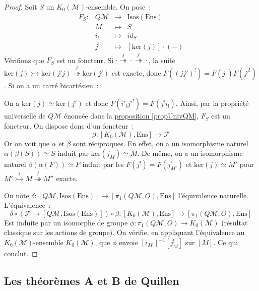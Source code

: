 \documentclass{amsart}
\newcommand{\sref}[2]{\hyperref[#2]{#1 \ref*{#2}}}
\theoremstyle{plain}
\theoremstyle{definition}
\theoremstyle{remark}
\newcommand{\M}{\mathcal{M}}
\newcommand{\Isos}[1]{\mathrm{Isos}(#1)}
\newcommand{\Ens}{\mathrm{Ens}}
\newcommand{\xrightarrowtail}[1]{\overset{#1}{\rightarrowtail}}
\newcommand{\xtwoheadrightarrow}[1]{\overset{#1}{\twoheadrightarrow}}
\newcommand{\ra}{\rightarrow}
\newcommand{\exacname}[5]{{#1}\xrightarrowtail{#2} {#3}\xtwoheadrightarrow{#4} {#5}}
\newcommand{\myker}[1]{\mathrm{ker}({#1})}
\begin{document}
\begin{proof}
  Soit $S$ un $K_0(\M)$-ensemble. On pose~:
  \[
    \begin{array}{cccc}
      F_S: & Q\M                                       &\ra    & \Isos{\Ens} \\
           & M                                         &\mapsto& S   \\
           & i_!                                       &\mapsto& id_S \\
           & j^!                                       &\mapsto& [\myker{j}]\cdot(-)
    \end{array}
  \]
  Vérifions que $F_S$ est un foncteur. Si $\cdot\xtwoheadrightarrow{j}\cdot\xtwoheadrightarrow{j'}\cdot$, la suite
  $\exacname{\myker{j}}{}{\myker{j'j}}{j}{\myker{j'}}$
  est exacte, donc $F((jj')^!)=F(j^!)F(j'^!)$. Si on a un carré bicartésien~:
  \begin{center}
  \end{center}
  On a $\myker{j}\simeq\myker{j'}$ et donc $F(i'_!j'^!)=F(j^!i_!)$. Ainsi, par la propriété universelle de $Q\M$ énoncée dans la
  \sref{proposition}{propUnivQM}, $F_S$ est un foncteur.
  On dispose donc d'un foncteur~:
  $$\beta: [K_0(\M),\Ens]\ra \mathcal{F}$$
  Or on voit que $\alpha$ et $\beta$ sont réciproques. En effet, on a un isomorphisme naturel $\alpha(\beta(S))\simeq S$ 
  induit par $\myker{j_M}\simeq M$.
  De même, on a un isomorphisme naturel $\beta(\alpha(F))\simeq F$ induit par les $F(j^!)=F(j^!_{M'})$ et $\myker{j}\simeq M'$
  pour $\exacname{M'}{i}{M}{j}{M''}$ exacte.

  On note $\delta:[Q\M,\Isos{\Ens}] \ra [\pi_1(Q\M,O),\Ens]$ l'équivalence naturelle. L'équivalence~:
  $$\delta\circ(\mathcal{F}\ra [Q\M,\Isos{\Ens}])\circ\beta:[K_0(\M),\Ens]\ra [\pi_1(Q\M,O),\Ens]$$
  Est induite par un isomorphe de groupe $\phi: \pi_1(Q\M,O)\ra K_0(\M)$ (résultat classique sur les actions de groupe).
  On vérifie, en appliquant l'équivalence au $K_0(\M)$-ensemble $K_0(\M)$, que $\phi$ envoie $[i_{M!}]^{-1}[j_M^!]$ sur ${[{M}]}$.
  Ce qui conclut.
\end{proof}

\subsection{Les théorèmes A et B de Quillen}\label{thmAetB}
\end{document}
